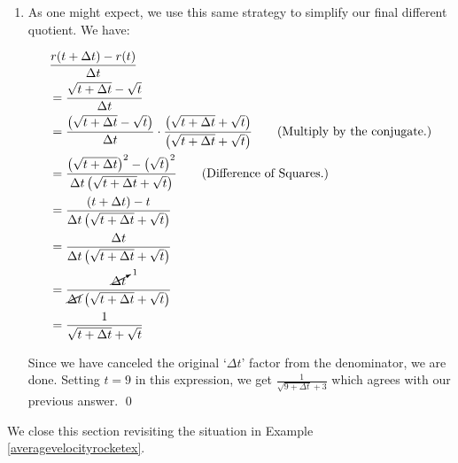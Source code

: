 \begin{ex}
\begin{enumerate}
\begin{enumerate}
\item As one might expect, we use this same strategy to simplify our final  different quotient. We have:

\begin{align*}
& \dfrac{r(t+\Delta t) - r(t)}{\Delta t} \\
& = \dfrac{\sqrt{t+\Delta t} - \sqrt{t}}{\Delta t} \\
& = \dfrac{\left(\sqrt{t+\Delta t} - \sqrt{t}\right)}{\Delta t} \cdot \dfrac{\left(\sqrt{t+\Delta t} + \sqrt{t}\right)}{\left(\sqrt{t+\Delta t} + \sqrt{t}\right)} \tag{Multiply by the conjugate.} \\
& = \dfrac{\left(\sqrt{t+\Delta t}\right)^2 - \left(\sqrt{t}\right)^2}{\Delta t\left(\sqrt{t+\Delta t} + \sqrt{t}\right)} \tag{Difference of Squares.}\\
& = \dfrac{(t+\Delta t) - t}{\Delta t\left(\sqrt{t+\Delta t} + \sqrt{t}\right)} \\
& = \dfrac{\Delta t}{\Delta t\left(\sqrt{t+\Delta t} + \sqrt{t}\right)} \\
& = \dfrac{\cancelto{1}{\Delta t}}{\cancel{\Delta t}\left(\sqrt{t+\Delta t} + \sqrt{t}\right)} \\
& = \dfrac{1}{\sqrt{t+\Delta t} + \sqrt{t}} \\ 
\end{align*}

Since we have canceled the original `$\Delta t$' factor from the denominator, we are done.  Setting $t=9$ in this expression, we get $\frac{1}{\sqrt{9+\Delta t} +3}$ which agrees with our previous answer. \qed

\end{enumerate}

\end{enumerate}

\end{ex}

We close this section revisiting the situation in Example \ref{averagevelocityrocketex}. 


